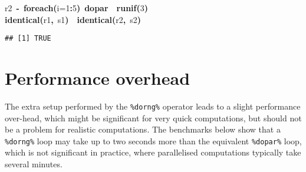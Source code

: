 \documentclass[a4paper,12pt]{article}\usepackage{graphicx, color}
\makeatletter
\newcommand{\hlnumber}[1]{\textcolor[rgb]{0,0,0}{#1}}%
\newcommand{\hlfunctioncall}[1]{\textcolor[rgb]{0.501960784313725,0,0.329411764705882}{\textbf{#1}}}%
\newcommand{\hlkeyword}[1]{\textcolor[rgb]{0,0,0}{\textbf{#1}}}%
\newcommand{\hlargument}[1]{\textcolor[rgb]{0.690196078431373,0.250980392156863,0.0196078431372549}{#1}}%
\newcommand{\hlassignement}[1]{\textcolor[rgb]{0,0,0}{\textbf{#1}}}%
\newcommand{\hlsymbol}[1]{\textcolor[rgb]{0,0,0}{#1}}%
\newcommand{\hlstd}[1]{\textcolor[rgb]{0,0,0}{#1}}%
\newenvironment{kframe}{%
 \def\FrameCommand##1{\hskip\@totalleftmargin \hskip-\fboxsep
 \colorbox{shadecolor}{##1}\hskip-\fboxsep
     \hskip-\linewidth \hskip-\@totalleftmargin \hskip\columnwidth}%
 \MakeFramed {\advance\hsize-\width
   \@totalleftmargin\z@ \linewidth\hsize
   \@setminipage}}%
 {\par\unskip\endMakeFramed}
\newenvironment{knitrout}{}{} %
\renewenvironment{knitrout}{\begin{footnotesize}}{\end{footnotesize}}
\let\code=\texttt
\makeatother
\begin{document}
\begin{knitrout}
\begin{kframe}
\begin{flushleft}
\hlstd{}\hlsymbol{r2}{\ }\hlassignement{\usebox{\hlnormalsizeboxlessthan}-}{\ }\hlfunctioncall{foreach}\hlkeyword{(}\hlargument{i}\hlargument{=}\hlnumber{1}\hlkeyword{:}\hlnumber{5}\hlkeyword{)}{\ }\hlkeyword{\usebox{\hlnormalsizeboxpercent}dopar\usebox{\hlnormalsizeboxpercent}}{\ }\hlkeyword{\usebox{\hlnormalsizeboxopenbrace}}{\ }\hlfunctioncall{runif}\hlkeyword{(}\hlnumber{3}\hlkeyword{)}{\ }\hlkeyword{\usebox{\hlnormalsizeboxclosebrace}}\hspace*{\fill}\\
\hlstd{}\hlfunctioncall{identical}\hlkeyword{(}\hlsymbol{r1}\hlkeyword{,}{\ }\hlsymbol{s1}\hlkeyword{)}{\ }\hlkeyword{\usebox{\hlnormalsizeboxand}\usebox{\hlnormalsizeboxand}}{\ }\hlfunctioncall{identical}\hlkeyword{(}\hlsymbol{r2}\hlkeyword{,}{\ }\hlsymbol{s2}\hlkeyword{)}\mbox{}
\normalfont
\end{flushleft}
\begin{verbatim}
## [1] TRUE
\end{verbatim}
\end{kframe}
\end{knitrout}


\section{Performance overhead}

The extra setup performed by the \code{\%dorng\%} operator leads to a slight
performance over-head, which might be significant for very quick computations, but should
not be a problem for realistic computations.
The benchmarks below show that a \code{\%dorng\%} loop may take up to two
seconds more than the equivalent \code{\%dopar\%} loop, which is not significant
in practice, where parallelised computations typically take several minutes.  
\end{document}
